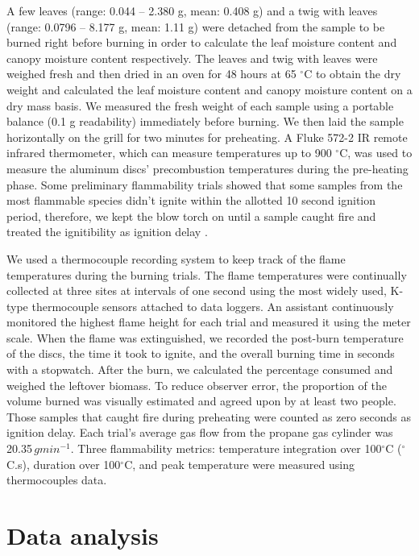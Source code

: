 \documentclass{bmcart}
\begin{document}
A few leaves (range: 0.044 -- 2.380 g, mean: 0.408 g) and a twig with leaves (range: 0.0796 -- 8.177 g, mean: 1.11 g) were detached from the sample to be burned right before burning in order to calculate the leaf moisture content and canopy moisture content respectively. The leaves and twig with leaves were weighed fresh and then dried in an oven for 48 hours at 65 $^{\circ}$C to obtain the dry weight and calculated the leaf moisture content and canopy moisture content on a dry mass basis. We measured the fresh weight of each sample using a portable balance (0.1 g readability) immediately before burning. We then laid the sample horizontally on the grill for two minutes for preheating. A Fluke 572-2 IR remote infrared thermometer, which can measure temperatures up to 900 $^{\circ}$C, was used to measure the aluminum discs' precombustion temperatures during the pre-heating phase. Some preliminary flammability trials showed that some samples from the most flammable species didn't ignite within the allotted 10 second ignition period, therefore, we kept the blow torch on until a sample caught fire and treated the ignitibility as ignition delay \citep{anderson1970forest}.  
 

We used a thermocouple recording system to keep track of the flame temperatures during the burning trials. The flame temperatures were continually collected at three sites at intervals of one second using the most widely used, K-type thermocouple sensors \citep{mcgranahan2020inconvenient} attached to data loggers. An assistant continuously monitored the highest flame height for each trial and measured it using the meter scale. When the flame was extinguished, we recorded the post-burn temperature of the discs, the time it took to ignite, and the overall burning time in seconds with a stopwatch. After the burn, we calculated the percentage consumed and weighed the leftover biomass. To reduce observer error, the proportion of the volume burned was visually estimated and agreed upon by at least two people. Those samples that caught fire during preheating were counted as zero seconds as ignition delay. Each trial's average gas flow from the propane gas cylinder was 20.35\,$g min^{-1}$. Three flammability metrics: temperature integration over 100$^{\circ}$C ($^{\circ}$C.s), duration over 100$^{\circ}$C, and peak temperature were measured using thermocouples data.

\section*{Data analysis}
\end{document}

